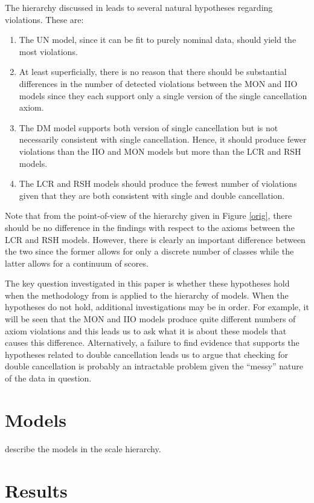 \documentclass[12pt]{article}
\begin{document}
The hierarchy discussed in  leads to several natural hypotheses regarding violations. These are:
\begin{enumerate}
\item The UN model, since it can be fit to purely nominal data, should yield the most violations.
\item At least superficially, there is no reason that there should be substantial differences in the number of detected violations between the MON and IIO models since they each support only a single version of the single cancellation axiom.
\item The DM model supports both version of single cancellation but is not necessarily consistent with single cancellation. Hence, it should produce fewer violations than the IIO and MON models but more than the LCR and RSH models.
\item The LCR and RSH models should produce the fewest number of violations given that they are both consistent with single and double cancellation.
\end{enumerate}
Note that from the point-of-view of the hierarchy given in Figure \ref{orig}, there should be no difference in the findings with respect to the axioms between the LCR and RSH models. However, there is clearly an important difference between the two since the former allows for only a discrete number of classes while the latter allows for a continuum of scores. 

The key question investigated in this paper is whether these hypotheses hold when the methodology from  is applied to the hierarchy of models. When the hypotheses do not hold, additional investigations may be in order. For example, it will be seen that the MON and IIO models produce quite different numbers of axiom violations and this leads us to ask what it is about these models that causes this difference. Alternatively, a failure to find evidence that supports the hypotheses related to double cancellation leads us to argue that checking for double cancellation is probably an intractable problem given the ``messy'' nature of the data in question.

\section{Models}
describe the models in the scale hierarchy. 

 
\section{Results}
\end{document}
